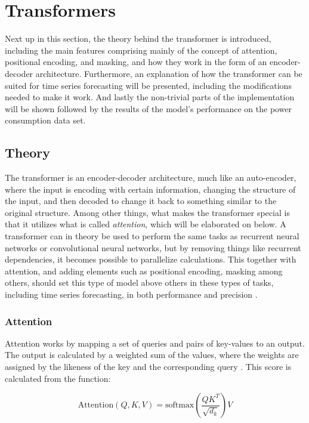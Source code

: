 \documentclass[main.tex]{subfiles}
\begin{document}
\section{Transformers}

Next up in this section, the theory behind the transformer is introduced, including the main features comprising mainly of the concept of attention, positional encoding, and masking, and how they work in the form of an encoder-decoder architecture. Furthermore, an explanation of how the transformer can be suited for time series forecasting will be presented, including the modifications needed to make it work. And lastly the non-trivial parts of the implementation will be shown followed by the results of the model's performance on the power consumption data set.

\subsection{Theory}
The transformer is an encoder-decoder architecture, much like an auto-encoder, where the input is encoding with certain information, changing the structure of the input, and then decoded to change it back to something similar to the original structure. Among other things, what makes the transformer special is that it utilizes what is called \textit{attention}, which will be elaborated on below. A transformer can in theory be used to perform the same tasks as recurrent neural networks or convolutional neural networks, but by removing things like recurrent dependencies, it becomes possible to parallelize calculations. This together with attention, and adding elements such as positional encoding, masking among others, should set this type of model above others in these types of tasks, including time series forecasting, in both performance and precision \cite{Attention}. 

\subsubsection{Attention}
Attention works by mapping a set of queries and pairs of key-values to an output. The output is calculated by a weighted sum of the values, where the weights are assigned by the likeness of the key and the corresponding query \cite{Attention}. This score is calculated from the function:

$$\text{Attention}(Q,K,V) = \text{softmax}(\frac{QK^T}{\sqrt{d_k}})V$$
\end{document}
